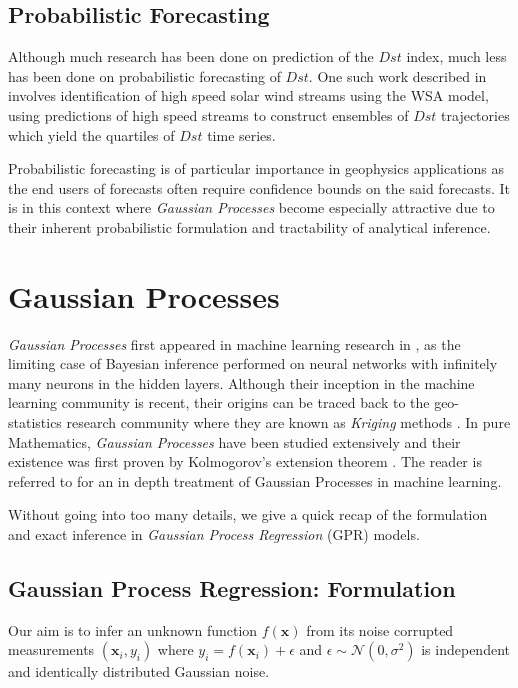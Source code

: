 \documentclass{article}
\begin{document}
\subsection{Probabilistic Forecasting}
Although much research has been done on prediction of the $Dst$ index, much less has been done on probabilistic forecasting of $Dst$. One such work described in \citet{McPherron:2013} involves identification of high speed solar wind streams using the WSA model, using predictions of high speed streams to construct ensembles of $Dst$ trajectories which yield the quartiles of $Dst$ time series. 

Probabilistic forecasting is of particular importance in geophysics applications as the end users of forecasts often require confidence bounds on the said forecasts. It is in this context where \emph{Gaussian Processes} become especially attractive due to their inherent probabilistic formulation and tractability of analytical inference.


\section{Gaussian Processes}

\emph{Gaussian Processes} first appeared in machine learning research in \citet{Neal:1996:BLN:525544}, as the limiting case of Bayesian inference performed on neural networks with infinitely many neurons in the hidden layers. Although their inception in the machine learning community is recent, their origins can be traced back to the geo-statistics research community where they are known as \emph{Kriging} methods \citep{krige1951statistical}. In pure Mathematics, \emph{Gaussian Processes} have been studied extensively and their existence was first proven by Kolmogorov's extension theorem \citep{tao2011introduction}. The reader is referred to \citet{Rasmussen:2005:GPM:1162254} for an in depth treatment of Gaussian Processes in machine learning.

Without going into too many details, we give a quick recap of the formulation and exact inference in \emph{Gaussian Process Regression} (GPR) models. 

\subsection{Gaussian Process Regression: Formulation}

Our aim is to infer an unknown function $f(\mathbf{x})$ from its noise corrupted measurements $(\mathbf{x}_i, y_i)$ where $y_i = f(\mathbf{x}_i) + \epsilon$ and $\epsilon \sim \mathcal{N}(0, \sigma^2)$ is independent and identically distributed Gaussian noise.
\end{document}
